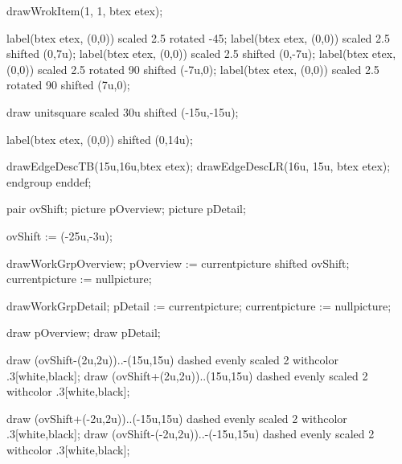 drawWrokItem(1, 1, btex  etex);

label(btex \mplabel{\math{\cdots}} etex, (0,0)) scaled 2.5 rotated -45;
label(btex \mplabel{\math{\cdots}} etex, (0,0)) scaled 2.5 shifted (0,7u);
label(btex \mplabel{\math{\cdots}} etex, (0,0)) scaled 2.5 shifted (0,-7u);
label(btex \mplabel{\math{\cdots}} etex, (0,0)) scaled 2.5 rotated 90 shifted (-7u,0);
label(btex \mplabel{\math{\cdots}} etex, (0,0)) scaled 2.5 rotated 90 shifted (7u,0);

draw unitsquare scaled 30u shifted (-15u,-15u);

label(btex  etex, (0,0)) shifted (0,14u);

drawEdgeDescTB(15u,16u,btex  etex);
drawEdgeDescLR(16u, 15u, btex  etex);
endgroup
enddef;

pair ovShift;
picture pOverview;
picture pDetail;

ovShift := (-25u,-3u);

drawWorkGrpOverview;
pOverview := currentpicture shifted ovShift;
currentpicture := nullpicture;

drawWorkGrpDetail;
pDetail := currentpicture;
currentpicture := nullpicture;

draw pOverview;
draw pDetail;

draw (ovShift-(2u,2u))..-(15u,15u) dashed evenly scaled 2 withcolor .3[white,black];
draw (ovShift+(2u,2u))..(15u,15u) dashed evenly scaled 2 withcolor .3[white,black];

draw (ovShift+(-2u,2u))..(-15u,15u) dashed evenly scaled 2 withcolor .3[white,black];
draw (ovShift-(-2u,2u))..-(-15u,15u) dashed evenly scaled 2 withcolor .3[white,black];
\stopreusableMPgraphic
